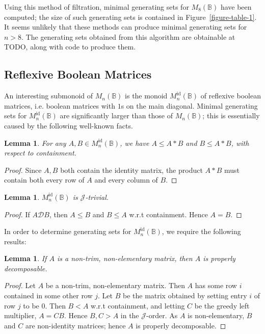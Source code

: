 \documentclass[11pt]{article}
\newtheorem{lemma}[thm]{Lemma}
\numberwithin{equation}{section}
\newcommand{\B}{\mathbb{B}}
\newcommand{\Bn}{M_n(\B)}
\newcommand{\Bm}[1]{M_{#1}(\B)}
\newcommand{\Refn}{M_n^{\text{id}}(\B)}
\newcommand{\D}{\mathscr{D}}
\newcommand{\J}{\mathscr{J}}
\begin{document}
Using this method of filtration, minimal generating sets for $\Bm{8}$ have been
computed; the size of such generating sets is contained in
Figure~\ref{figure-table-1}. It seems unlikely that these methods can produce
minimal generating sets for $n > 8$. The generating sets obtained from this
algorithm are obtainable at TODO, along with code to produce them.

\subsection{Reflexive Boolean Matrices}
An interesting submonoid of $\Bn$ is the monoid $\Refn$ of reflexive boolean
matrices, i.e. boolean matrices with $1$s on the main diagonal. Minimal
generating sets for $\Refn$ are significantly larger than those of $\Bn$; this
is essentially caused by the following well-known facts.

\begin{lemma}
  For any $A, B \in \Refn$, we have $A \leq A * B$ and $B \leq A * B$, with
  respect to containment.
\end{lemma}
\begin{proof}
  Since $A, B$ both contain the identity matrix, the product $A * B$ must
  contain both every row of $A$ and every column of $B$.
\end{proof}

\begin{lemma}
  $\Refn$ is $\J$-trivial. 
\end{lemma}
\begin{proof}
  If $A \D B$, then $A \leq B$ and $B \leq A$ w.r.t containment. Hence $A = B$.    
\end{proof}

In order to determine generating sets for $\Refn$, we require the following results:

\begin{lemma}
  If $A$ is a non-trim, non-elementary matrix, then $A$ is properly
  decomposable.
\end{lemma}
\begin{proof}
Let $A$ be a non-trim, non-elementary matrix. Then $A$ has some row $i$
contained in some other row $j$. Let $B$ be the matrix obtained by setting entry
$i$ of row $j$ to be $0$. Then $B < A$ w.r.t containment, and letting $C$ be the
greedy left multiplier, $A = CB$. Hence $B, C > A$ in the $\J$-order. As $A$ is
non-elementary, $B$ and $C$ are non-identity matrices; hence $A$ is properly
decomposable.
\end{proof}
\end{document}
